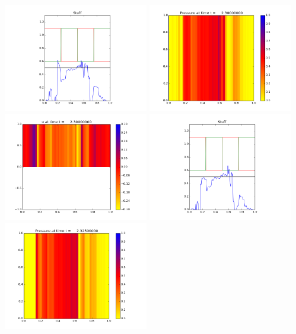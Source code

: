 \documentclass[11pt]{article}
\begin{document}
\vskip 10pt 
\includegraphics[width=0.475\textwidth]{frame0091fig3.png}
\vskip 10pt 
\includegraphics[width=0.475\textwidth]{frame0092fig0.png}
\includegraphics[width=0.475\textwidth]{frame0092fig1.png}
\vskip 10pt 
\includegraphics[width=0.475\textwidth]{frame0092fig3.png}
\vskip 10pt 
\includegraphics[width=0.475\textwidth]{frame0093fig0.png}
\end{document}
